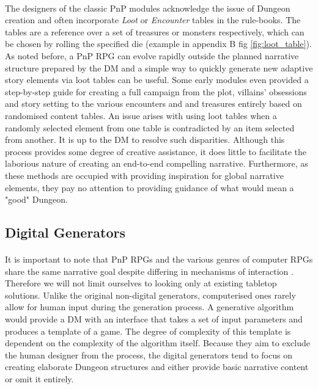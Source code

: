 \documentclass{UoYCSproject}
\begin{document}
\paragraph{}
The designers of the classic PnP modules acknowledge the issue of Dungeon creation and often incorporate \textit{Loot} or \textit{Encounter} tables in the rule-books. The tables are a reference over a set of treasures or monsters respectively, which can be chosen by rolling the specified die (example in appendix B fig \ref{fig:loot_table}). As noted before, a PnP RPG can evolve rapidly outside the planned narrative structure prepared by the DM and a simple way to quickly generate new adaptive story elements via loot tables can be useful. Some early modules even provided a step-by-step guide for creating a full campaign from the plot, villains' obsessions and story setting to the various encounters and and treasures \parencite{ADnD} entirely based on randomised content tables. An issue arises with using loot tables when a randomly selected element from one table is contradicted by an item selected from another. It is up to the DM to resolve such disparities. Although this process provides some degree of creative assistance, it does little to facilitate the laborious nature of creating an end-to-end compelling narrative. Furthermore, as these methods are occupied with providing inspiration for global narrative elements, they pay no attention to providing guidance of what would mean a "good" Dungeon.

\subsection{Digital Generators}
\label{subsec:DigGen}
\paragraph{}
It is important to note that PnP RPGs and the various genres of computer RPGs share the same narrative goal despite differing in mechanisms of interaction \parencite{Tychsen2006}. Therefore we will not limit ourselves to looking only at existing tabletop solutions.
Unlike the original non-digital generators, computerised ones rarely allow for human input during the generation process. A generative algorithm would provide a DM with an interface that takes a set of input parameters and produces a template of a game. The degree of complexity of this template is dependent on the complexity of the algorithm itself. Because they aim to exclude the human designer from the process, the digital generators tend to focus on creating elaborate Dungeon structures and either provide basic narrative content or omit it entirely.
\end{document}
